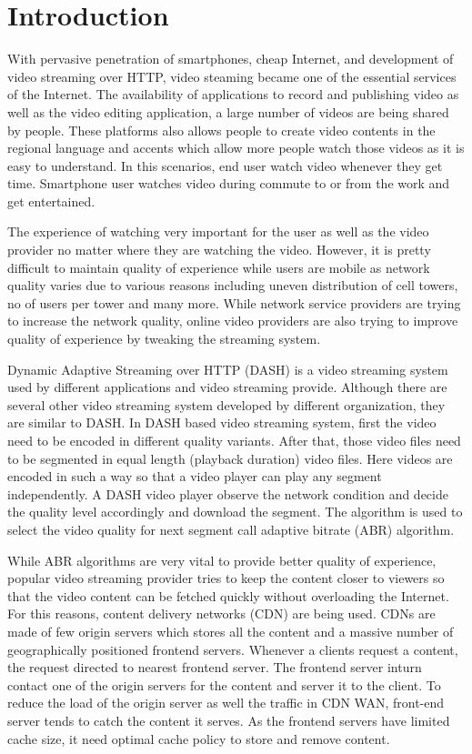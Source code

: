 \section{Introduction}
With pervasive penetration of smartphones, cheap Internet, and development of video streaming over HTTP, video steaming became one of the essential services of the Internet. The availability of applications to record and publishing video as well as the video editing application, a large number of videos are being shared by people. These platforms also allows people to create video contents in the regional language and accents which allow more people watch those videos as it is easy to understand. In this scenarios, end user watch video whenever they get time. Smartphone user watches video during commute to or from the work and get entertained.

The experience of watching very important for the user as well as the video provider no matter where they are watching the video. However, it is pretty difficult to maintain quality of experience while users are mobile as network quality varies due to various reasons including uneven distribution of cell towers, no of users per tower and many more. While network service providers are trying to increase the network quality, online video providers are also trying to improve quality of experience by tweaking the streaming system.

Dynamic Adaptive Streaming over HTTP (DASH) is a video streaming system used by different applications and video streaming provide. Although there are several other video streaming system developed by different organization, they are similar to DASH. In DASH based video streaming system, first the video need to be encoded in different quality variants. After that, those video files need to be segmented in equal length (playback duration) video files. Here videos are encoded in such a way so that a video player can play any segment independently. A DASH video player observe the network condition and decide the quality level accordingly and download the segment. The algorithm is used to select the video quality for next segment call adaptive bitrate (ABR) algorithm.

While ABR algorithms are very vital to provide better quality of experience, popular video streaming provider tries to keep the content closer to viewers so that the video content can be fetched quickly without overloading the Internet. For this reasons, content delivery networks (CDN) are being used. CDNs are made of few origin servers which stores all the content and a massive number of geographically positioned frontend servers. Whenever a clients request a content, the request directed to nearest frontend server. The frontend server inturn contact one of the origin servers for the content and server it to the client. To reduce the load of the origin server as well the traffic in CDN WAN, front-end server tends to catch the content it serves. As the frontend servers have limited cache size, it need optimal cache policy to store and remove content.

